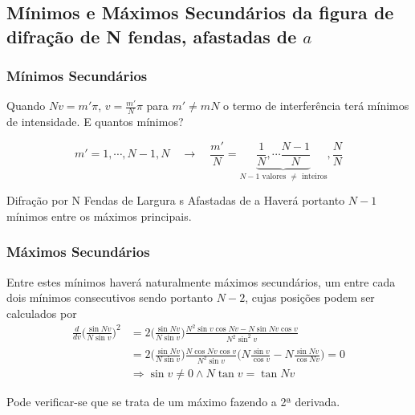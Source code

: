 \documentclass[a4paper,12pt]{article}
\begin{document}
\subsection{Mínimos e Máximos Secundários da figura de difração de N fendas, afastadas de $a$}
\label{sec:maxminNfendas}
\subsubsection{Mínimos Secundários}

Quando $N v = m' \pi$, $v= \frac{m'}{N } \pi$ para $m' \ne m N$ o termo de interferência terá mínimos de intensidade.
E quantos mínimos?
   
\begin{equation*}
	\label{eq:fendasminimos}
	m' =1, \cdots, N-1, N  \quad \rightarrow \quad \frac{m'}{N} = \underbrace{\frac{1}{N}, \cdots  \frac{N-1}{N}}_{N-1 \text{ valores } \ne \text{ inteiros}} , \frac{N}{N}
\end{equation*}

Difração por N Fendas de Largura s Afastadas de a
Haverá  portanto $N-1$ mínimos entre os máximos principais. 
\subsubsection{Máximos Secundários}
Entre estes mínimos haverá naturalmente máximos secundários, um entre cada dois mínimos consecutivos sendo portanto $N-2$, cujas posições podem ser calculados por
\begin{align}
	\frac{d}{d v} \big( \frac{\sin N v }{N \sin v} \big)^2 &= 2 \big( \frac{\sin N v }{N \sin v} \big)
	 \frac{N^2 \sin v \cos N v - N \sin N v \cos v }{N^2 \sin^2 v} \nonumber \\
	&= 2 \big( \frac{\sin N v }{N \sin v} \big)  \frac{N \cos N v \cos v}{N^2 \sin v}
	\big( N\frac{\sin v}{\cos v}  - N\frac{\sin N v}{\cos N v} \big) = 0 \nonumber \\
	&\Rightarrow \sin v \ne 0 \land N \tan v =  \tan Nv \label{eq:47}
\end{align}

Pode verificar-se que se trata de um máximo fazendo a 2ª derivada.
\end{document}

